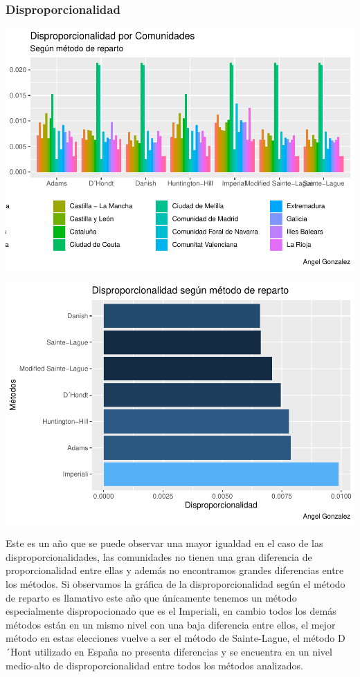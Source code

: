 \documentclass[12pt,a4paper,]{book}
\numberwithin{dummy}{section}
\theoremstyle{ocrenumbox}
\theoremstyle{blacknumex}
\theoremstyle{blacknumbox}
\theoremstyle{ocrenum}
\theoremstyle{ocrenum}
\begin{document}
\hypertarget{disproporcionalidad-8}{%
\subsubsection{Disproporcionalidad}\label{disproporcionalidad-8}}

\begin{center}\includegraphics[width=0.95\linewidth]{figurasR/unnamed-chunk-93-1} \end{center}

\begin{center}\includegraphics[width=0.95\linewidth]{figurasR/unnamed-chunk-93-2} \end{center}

Este es un año que se puede observar una mayor igualdad en el caso de
las disproporcionalidades, las comunidades no tienen una gran diferencia
de proporcionalidad entre ellas y además no encontramos grandes
diferencias entre los métodos. Si observamos la gráfica de la
disproporcionalidad según el método de reparto es llamativo este año que
únicamente tenemos un método especialmente dispropocionado que es el
Imperiali, en cambio todos los demás métodos están en un mismo nivel con
una baja diferencia entre ellos, el mejor método en estas elecciones
vuelve a ser el método de Sainte-Lague, el método D´Hont utilizado en
España no presenta diferencias y se encuentra en un nivel medio-alto de
disproporcionalidad entre todos los métodos analizados.
\end{document}
